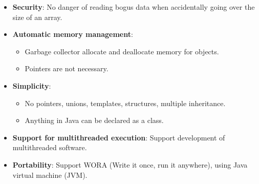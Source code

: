 \begin{flushleft}
	
	\begin{itemize}
		\item \textbf{Security}: No danger of reading bogus data when accidentally going over the size of an array.
		\item \textbf{Automatic memory management}: 
		\begin{itemize}
			\item Garbage collector allocate and deallocate memory for objects. 
			\item Pointers are not necessary.
		\end{itemize}
		
		\item \textbf{Simplicity}: 
		\begin{itemize}
			\item No pointers, unions, templates, structures, multiple inheritance. 
			\item Anything in Java can be declared as a class.
		\end{itemize}
		
		\item \textbf{Support for multithreaded execution}: Support development of multithreaded software.
		\item \textbf{Portability}: Support WORA (Write it once, run it anywhere), using Java virtual machine (JVM).
		
	\end{itemize}

\end{flushleft}

\newpage